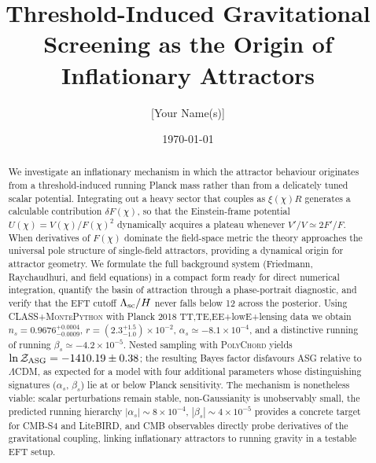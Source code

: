 \documentclass[11pt,a4paper]{article}
\title{Threshold-Induced Gravitational Screening as the Origin of Inflationary Attractors}
\author{[Your Name(s)]}
\date{\today}
\begin{document}
\maketitle

\begin{abstract}
We investigate an inflationary mechanism in which the attractor behaviour originates from a threshold-induced running Planck mass rather than from a delicately tuned scalar potential. Integrating out a heavy sector that couples as $\xi(\chi) R$ generates a calculable contribution $\delta F(\chi)$, so that the Einstein-frame potential $U(\chi)=V(\chi)/F(\chi)^2$ dynamically acquires a plateau whenever $V'/V\simeq2F'/F$. When derivatives of $F(\chi)$ dominate the field-space metric the theory approaches the universal pole structure of single-field attractors, providing a dynamical origin for attractor geometry. We formulate the full background system (Friedmann, Raychaudhuri, and field equations) in a compact form ready for direct numerical integration, quantify the basin of attraction through a phase-portrait diagnostic, and verify that the EFT cutoff $\Lambda_{\rm sc}/H$ never falls below 12 across the posterior. Using \textsc{CLASS}+\textsc{MontePython} with Planck 2018 TT,TE,EE+lowE+lensing data we obtain $n_s=0.9676^{+0.0004}_{-0.0009}$, $r=(2.3^{+1.5}_{-1.0})\times10^{-2}$, $\alpha_s\simeq-8.1\times10^{-4}$, and a distinctive running of running $\beta_s\simeq-4.2\times10^{-5}$. Nested sampling with \textsc{PolyChord} yields $\ln\mathcal{Z}_{\rm ASG}=-1410.19\pm0.38$; the resulting Bayes factor disfavours ASG relative to $\Lambda$CDM, as expected for a model with four additional parameters whose distinguishing signatures ($\alpha_s$, $\beta_s$) lie at or below Planck sensitivity. The mechanism is nonetheless viable: scalar perturbations remain stable, non-Gaussianity is unobservably small, the predicted running hierarchy $|\alpha_s|\sim8\times10^{-4}$, $|\beta_s|\sim4\times10^{-5}$ provides a concrete target for CMB-S4 and LiteBIRD, and CMB observables directly probe derivatives of the gravitational coupling, linking inflationary attractors to running gravity in a testable EFT setup.
\end{abstract}
\end{document}
